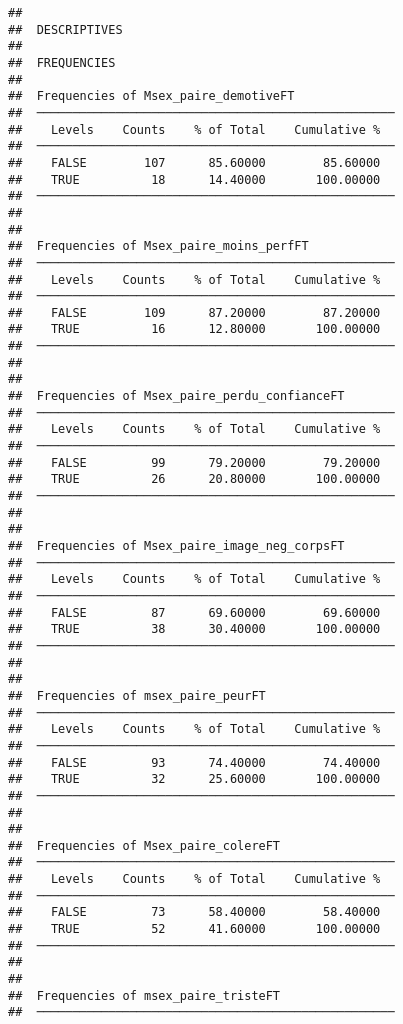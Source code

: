 \documentclass[
]{article}
\begin{document}
\begin{verbatim}
## 
##  DESCRIPTIVES
## 
##  FREQUENCIES
## 
##  Frequencies of Msex_paire_demotiveFT               
##  ────────────────────────────────────────────────── 
##    Levels    Counts    % of Total    Cumulative %   
##  ────────────────────────────────────────────────── 
##    FALSE        107      85.60000        85.60000   
##    TRUE          18      14.40000       100.00000   
##  ────────────────────────────────────────────────── 
## 
## 
##  Frequencies of Msex_paire_moins_perfFT             
##  ────────────────────────────────────────────────── 
##    Levels    Counts    % of Total    Cumulative %   
##  ────────────────────────────────────────────────── 
##    FALSE        109      87.20000        87.20000   
##    TRUE          16      12.80000       100.00000   
##  ────────────────────────────────────────────────── 
## 
## 
##  Frequencies of Msex_paire_perdu_confianceFT        
##  ────────────────────────────────────────────────── 
##    Levels    Counts    % of Total    Cumulative %   
##  ────────────────────────────────────────────────── 
##    FALSE         99      79.20000        79.20000   
##    TRUE          26      20.80000       100.00000   
##  ────────────────────────────────────────────────── 
## 
## 
##  Frequencies of Msex_paire_image_neg_corpsFT        
##  ────────────────────────────────────────────────── 
##    Levels    Counts    % of Total    Cumulative %   
##  ────────────────────────────────────────────────── 
##    FALSE         87      69.60000        69.60000   
##    TRUE          38      30.40000       100.00000   
##  ────────────────────────────────────────────────── 
## 
## 
##  Frequencies of msex_paire_peurFT                   
##  ────────────────────────────────────────────────── 
##    Levels    Counts    % of Total    Cumulative %   
##  ────────────────────────────────────────────────── 
##    FALSE         93      74.40000        74.40000   
##    TRUE          32      25.60000       100.00000   
##  ────────────────────────────────────────────────── 
## 
## 
##  Frequencies of Msex_paire_colereFT                 
##  ────────────────────────────────────────────────── 
##    Levels    Counts    % of Total    Cumulative %   
##  ────────────────────────────────────────────────── 
##    FALSE         73      58.40000        58.40000   
##    TRUE          52      41.60000       100.00000   
##  ────────────────────────────────────────────────── 
## 
## 
##  Frequencies of msex_paire_tristeFT                 
##  ────────────────────────────────────────────────── 

\end{verbatim}
\end{document}

